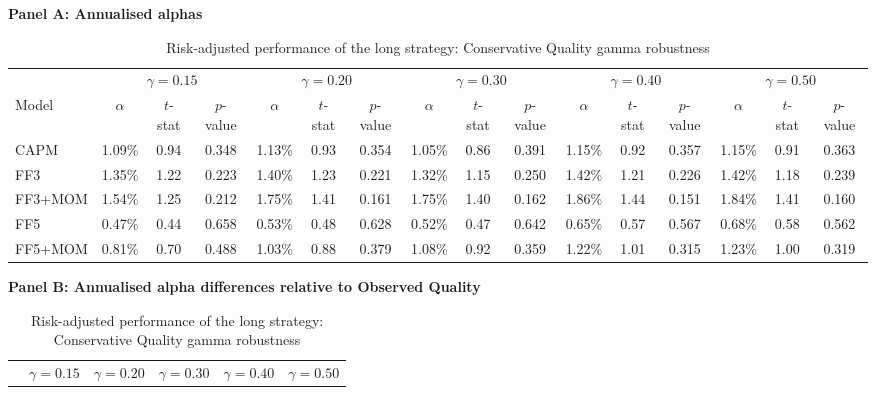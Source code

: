 \begin{table}[H]
\centering
\scriptsize
\renewcommand{\arraystretch}{1.12}
\setlength{\tabcolsep}{3pt}
\caption{Risk-adjusted performance of the long strategy: Conservative Quality gamma robustness}
\label{tab:conservative_gamma_q5_alpha_results}
\begin{threeparttable}
{\centering\textbf{Panel A: Annualised alphas}\par}
\vspace{0.4em}
\begin{tabular*}{\textwidth}{@{\extracolsep{\fill}}lccccccccccccccc}
\toprule
 & \multicolumn{3}{c}{$\gamma=0.15$} & \multicolumn{3}{c}{$\gamma=0.20$} & \multicolumn{3}{c}{$\gamma=0.30$} & \multicolumn{3}{c}{$\gamma=0.40$} & \multicolumn{3}{c}{$\gamma=0.50$} \\
\cmidrule(lr){2-4} \cmidrule(lr){5-7} \cmidrule(lr){8-10} \cmidrule(lr){11-13} \cmidrule(lr){14-16}
Model & $\alpha$ & $t$-stat & $p$-value & $\alpha$ & $t$-stat & $p$-value & $\alpha$ & $t$-stat & $p$-value & $\alpha$ & $t$-stat & $p$-value & $\alpha$ & $t$-stat & $p$-value \\
\midrule
CAPM      & 1.09\% & 0.94 & 0.348 & 1.13\% & 0.93 & 0.354 & 1.05\% & 0.86 & 0.391 & 1.15\% & 0.92 & 0.357 & 1.15\% & 0.91 & 0.363 \\
FF3       & 1.35\% & 1.22 & 0.223 & 1.40\% & 1.23 & 0.221 & 1.32\% & 1.15 & 0.250 & 1.42\% & 1.21 & 0.226 & 1.42\% & 1.18 & 0.239 \\
FF3+MOM   & 1.54\% & 1.25 & 0.212 & 1.75\% & 1.41 & 0.161 & 1.75\% & 1.40 & 0.162 & 1.86\% & 1.44 & 0.151 & 1.84\% & 1.41 & 0.160 \\
FF5       & 0.47\% & 0.44 & 0.658 & 0.53\% & 0.48 & 0.628 & 0.52\% & 0.47 & 0.642 & 0.65\% & 0.57 & 0.567 & 0.68\% & 0.58 & 0.562 \\
FF5+MOM   & 0.81\% & 0.70 & 0.488 & 1.03\% & 0.88 & 0.379 & 1.08\% & 0.92 & 0.359 & 1.22\% & 1.01 & 0.315 & 1.23\% & 1.00 & 0.319 \\
\bottomrule
\end{tabular*}
\vspace{1em}
{\centering\textbf{Panel B: Annualised alpha differences relative to Observed Quality}\par}
\vspace{0.4em}
\begin{tabular*}{\textwidth}{@{\extracolsep{\fill}}lccccccccccccccc}
\toprule
 & \multicolumn{3}{c}{$\gamma=0.15$} & \multicolumn{3}{c}{$\gamma=0.20$} & \multicolumn{3}{c}{$\gamma=0.30$} & \multicolumn{3}{c}{$\gamma=0.40$} & \multicolumn{3}{c}{$\gamma=0.50$} \\

\end{tabular*}
\end{threeparttable}
\end{table}
